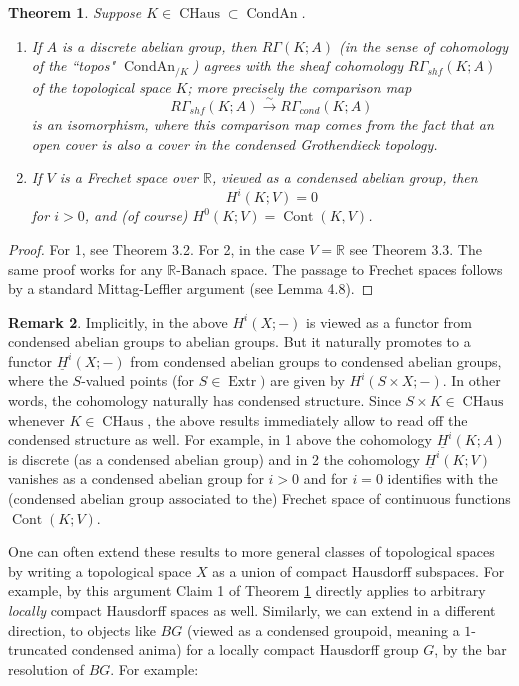 \documentclass[12pt]{article}
\newtheorem{theorem}{Theorem}[section]
\theoremstyle{definition}
\newtheorem{remark}[theorem]{Remark}
\newcommand{\on}{\operatorname}
\newcommand{\mbb}{\mathbb}
\newcommand{\ul}{\underline}
\begin{document}
\begin{theorem}\label{cohchaus}
Suppose $K\in\on{CHaus}\subset \on{CondAn}$.

\begin{enumerate}
\item If $A$ is a discrete abelian group, then $R\Gamma(K;A)$ (in the sense of cohomology of the ``topos" $\on{CondAn}_{/K}$) agrees with the sheaf cohomology $R\Gamma_{shf}(K;A)$ of the topological space $K$; more precisely the comparison map
$$R\Gamma_{shf}(K;A)\overset{\sim}{\rightarrow} R\Gamma_{cond}(K;A)$$
is an isomorphism, where this comparison map comes from the fact that an open cover is also a cover in the condensed Grothendieck topology.
\item If $V$ is a Frechet space over $\mbb{R}$, viewed as a condensed abelian group, then
$$H^i(K;V)=0$$
for $i>0$, and (of course) $H^0(K;V) = \on{Cont}(K,V)$.
\end{enumerate}
\end{theorem}
\begin{proof}
For 1, see \cite{condensed} Theorem 3.2.  For 2, in the case $V=\mbb{R}$ see \cite{condensed} Theorem 3.3.  The same proof works for any $\mbb{R}$-Banach space.  The passage to Frechet spaces follows by a standard Mittag-Leffler argument (see \cite{cscx} Lemma 4.8).
\end{proof}


\begin{remark}
Implicitly, in the above $H^i(X;-)$ is viewed as a functor from condensed abelian groups to abelian groups.  But it naturally promotes to a functor $\ul{H}^i(X;-)$ from condensed abelian groups to condensed abelian groups, where the $S$-valued points (for $S\in\on{Extr})$ are given by $H^i(S\times X;-)$.  In other words, the cohomology naturally has condensed structure.  Since $S\times K\in\on{CHaus}$ whenever $K\in\on{CHaus}$, the above results immediately allow to read off the condensed structure as well.  For example, in 1 above the cohomology $\ul{H}^i(K;A)$ is discrete (as a condensed abelian group) and in 2 the cohomology $\ul{H}^i(K;V)$ vanishes as a condensed abelian group for $i>0$ and for $i=0$ identifies with the (condensed abelian group associated to the) Frechet space of continuous functions $\on{Cont}(K;V)$.
\end{remark}


One can often extend these results to more general classes of topological spaces by writing a topological space $X$ as a union of compact Hausdorff subspaces.  For example, by this argument Claim 1 of Theorem \ref{cohchaus} directly applies to arbitrary \emph{locally} compact Hausdorff spaces as well.  Similarly, we can extend in a different direction, to objects like $BG$ (viewed as a condensed groupoid, meaning a $1$-truncated condensed anima) for a locally compact Hausdorff group $G$, by the bar resolution of $BG$.  For example:
\end{document}
